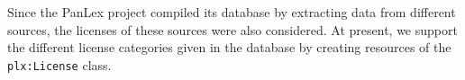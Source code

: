 \documentclass[sw]{iosart2c}
\begin{document}

Since the PanLex project compiled its database by extracting data from different sources, the licenses of these sources were also considered.
At present, we support the different license categories given in the database by creating resources of the \texttt{\small plx:License} class.
\end{document}
